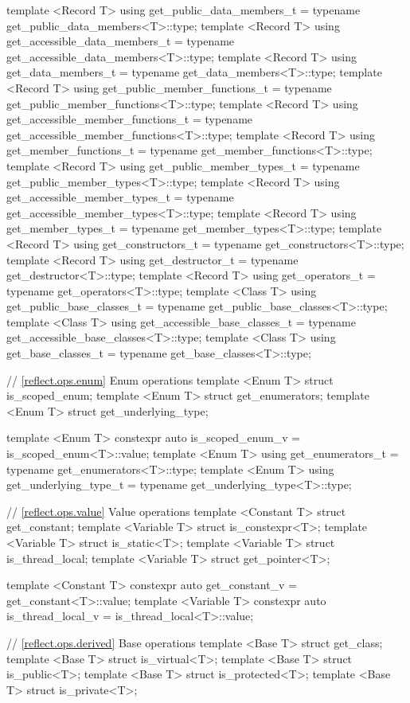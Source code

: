 \begin{std.txt}
\begin{codeblock}
{{{{template <Record T>
  using get_public_data_members_t = typename get_public_data_members<T>::type;
template <Record T>
  using get_accessible_data_members_t = typename get_accessible_data_members<T>::type;
template <Record T>
  using get_data_members_t = typename get_data_members<T>::type;
template <Record T>
  using get_public_member_functions_t = typename get_public_member_functions<T>::type;
template <Record T>
  using get_accessible_member_functions_t = typename get_accessible_member_functions<T>::type;
template <Record T>
  using get_member_functions_t = typename get_member_functions<T>::type;
template <Record T>
  using get_public_member_types_t = typename get_public_member_types<T>::type;
template <Record T>
  using get_accessible_member_types_t = typename get_accessible_member_types<T>::type;
template <Record T>
  using get_member_types_t = typename get_member_types<T>::type;
template <Record T>
  using get_constructors_t = typename get_constructors<T>::type;
template <Record T>
  using get_destructor_t = typename get_destructor<T>::type;
template <Record T>
  using get_operators_t = typename get_operators<T>::type;
template <Class T>
  using get_public_base_classes_t = typename get_public_base_classes<T>::type;
template <Class T>
  using get_accessible_base_classes_t = typename get_accessible_base_classes<T>::type;
template <Class T>
  using get_base_classes_t = typename get_base_classes<T>::type;

// \ref{reflect.ops.enum} Enum operations
template <Enum T> struct is_scoped_enum;
template <Enum T> struct get_enumerators;
template <Enum T> struct get_underlying_type;

template <Enum T>
  constexpr auto is_scoped_enum_v = is_scoped_enum<T>::value;
template <Enum T>
  using get_enumerators_t = typename get_enumerators<T>::type;
template <Enum T>
  using get_underlying_type_t = typename get_underlying_type<T>::type;

// \ref{reflect.ops.value} Value operations
template <Constant T> struct get_constant;
template <Variable T> struct is_constexpr<T>;
template <Variable T> struct is_static<T>;
template <Variable T> struct is_thread_local;
template <Variable T> struct get_pointer<T>;

template <Constant T>
  constexpr auto get_constant_v = get_constant<T>::value;
template <Variable T>
  constexpr auto is_thread_local_v = is_thread_local<T>::value;

// \ref{reflect.ops.derived} Base operations
template <Base T> struct get_class;
template <Base T> struct is_virtual<T>;
template <Base T> struct is_public<T>;
template <Base T> struct is_protected<T>;
template <Base T> struct is_private<T>;

}}}}
\end{codeblock}
\end{std.txt}
